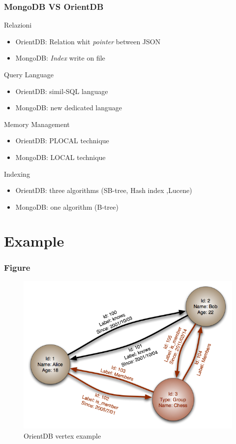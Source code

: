 \documentclass{beamer}
\begin{document}
\begin{frame}
\frametitle{MongoDB VS OrientDB}

\begin{block}{Relazioni}
\begin{itemize}
\item OrientDB: Relation whit \emph{pointer} between JSON
\item MongoDB: \emph{Index} write on file
\end{itemize}
\end{block}

\begin{block}{Query Language}
\begin{itemize}
\item OrientDB: simil-SQL language
\item MongoDB: new dedicated language 
\end{itemize}
\end{block}

\begin{block}{Memory Management}
\begin{itemize}
\item OrientDB: PLOCAL technique
\item MongoDB:  LOCAL technique
\end{itemize}
\end{block}

\begin{block}{Indexing}
\begin{itemize}
\item OrientDB: three algorithms (SB-tree, Hash index ,Lucene)
\item MongoDB:  one algorithm (B-tree)
\end{itemize}
\end{block}

\end{frame}


\section{Example}

\begin{frame}
\frametitle{Figure}
\begin{figure}
\includegraphics[width=0.8\linewidth]{GraphDatabase_PropertyGraph.png}
\caption{OrientDB vertex example}
\end{figure}
\end{frame}
\end{document}
